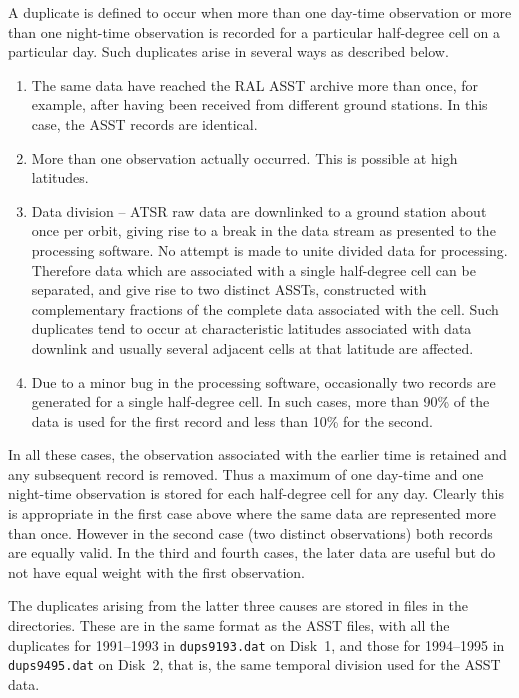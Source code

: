 A duplicate is defined to occur when more than one day-time observation or 
more than one night-time observation is recorded for a particular 
half-degree cell on a particular day.
Such duplicates arise in several ways as described below.
\begin{enumerate}
\item The same data have reached the RAL ASST archive 
more than once, for example,  after having been received from different 
ground stations. 
In this case, the ASST records are identical.

\item  More than one observation actually occurred. This is possible at high
latitudes.

\item Data division -- ATSR raw data are downlinked to a ground station 
about once per orbit, giving rise to a break in the data stream as presented
to the processing software.
No attempt is made to unite divided data for processing.
Therefore data which are associated with a single half-degree cell can 
be separated, and give rise to two distinct ASSTs, constructed with
complementary fractions of the complete data associated with the cell.
Such duplicates tend to occur at characteristic latitudes associated with
data downlink and usually several adjacent cells at that latitude are affected.

\item  Due to a minor bug in the processing software, occasionally 
two records are generated for a single half-degree cell. In such cases,
more than 90\% of the data is used for the first record and less than 10\% for
the second.

\end{enumerate}


In all these cases, the observation associated with the earlier time 
is retained and any subsequent record is removed.
Thus a maximum of one day-time and one night-time observation is 
stored for each half-degree cell for any day.
Clearly this is appropriate in the first case above where the same
data are represented more than once.
However in the second case (two distinct observations) both 
records are equally valid.
In the third and fourth cases, the later data are useful but
do not have equal weight with the first observation.

The duplicates arising from the latter three causes are 
stored in files in the  directories.
These are in the same format as the ASST files, with all the duplicates
for 1991--1993 in {\tt dups9193.dat} on Disk~1, and those for 1994--1995 in
{\tt dups9495.dat} on Disk~2, that is, the same temporal division used 
for the ASST data.


